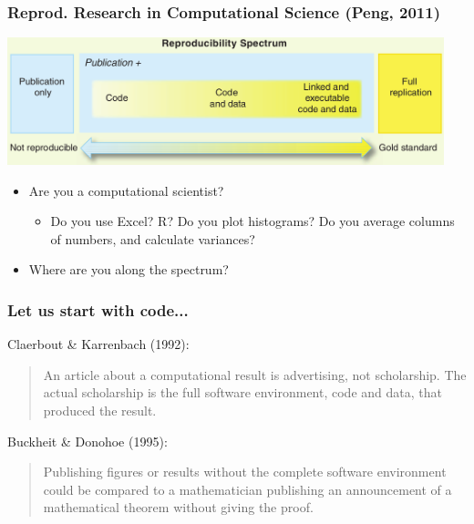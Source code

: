 \documentclass[c]{beamer} %
\begin{document}
\begin{frame}
  \frametitle{Reprod. Research in Computational Science (Peng, 2011)}
  \begin{center}
    \includegraphics[width=0.95\textwidth,height=0.90\textheight,keepaspectratio=true]{peng_11_reproducible-research_fig1}%
  \end{center}
  \pause
  \begin{itemize}
  \item Are you a computational scientist?
    \pause
    \begin{itemize}
    \item Do you use Excel? R? Do you plot histograms? Do you average columns of numbers, and calculate variances?
    \end{itemize}
    \bigskip
    \pause
  \item Where are you along the spectrum?
  \end{itemize}
\end{frame}

\begin{frame}
  \frametitle{Let us start with code...}
  Claerbout \& Karrenbach (1992):
  \begin{quote}
    An article about a computational result is advertising, not scholarship. The actual scholarship is the full software environment, code and data, that produced the result.
  \end{quote}
  
  \bigskip
  \pause
  
  Buckheit \& Donohoe (1995):
  \begin{quote}
    Publishing figures or results without the complete software environment could be compared to a mathematician publishing an announcement of a mathematical theorem without giving the proof.
  \end{quote}
\end{frame}
\end{document}
